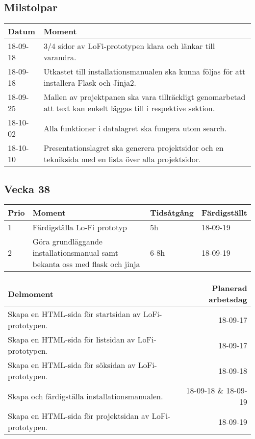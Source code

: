 \documentclass{TDP003mall}
\begin{document}
\subsection{Milstolpar}
\begin{table}[!h]
\begin{tabularx}{\linewidth}{|l|X|}\hline
    \textbf{Datum} & \textbf{Moment} \\\hline
    18-09-18 & 3/4 sidor av LoFi-prototypen klara och länkar till varandra. \\\hline
    18-09-18 & Utkastet till installationsmanualen ska kunna följas för att installera Flask och Jinja2. \\\hline
    18-09-25 & Mallen av projektpanen ska vara tillräckligt genomarbetad att text kan enkelt läggas till i respektive sektion. \\\hline
    18-10-02 & Alla funktioner i datalagret ska fungera utom search. \\\hline
    18-10-10 & Presentationslagret ska generera projektsidor och en tekniksida med en lista över alla projektsidor. \\\hline
\end{tabularx}
\end{table}


\subsection{Vecka 38}
\begin{table}[!h]
\begin{tabularx}{\linewidth}{|l|X|l|l|}
\hline
\textbf{Prio} & \textbf{Moment} & \textbf{Tidsåtgång} & \textbf{Färdigställt}\\\hline
1 & Färdigställa Lo-Fi prototyp & 5h & 18-09-19  \\\hline
2 & Göra grundläggande installationsmanual samt bekanta
oss med flask och jinja & 6-8h & 18-09-19 \\\hline
\end{tabularx}
\end{table}

\begin{table}[!h]
\begin{tabularx}{\linewidth}{|X|r|}\hline
    \textbf{Delmoment} & \textbf{ Planerad arbetsdag} \\\hline
    Skapa en HTML-sida för startsidan av LoFi-prototypen. & 18-09-17 \\\hline
    Skapa en HTML-sida för listsidan av LoFi-prototypen. & 18-09-17 \\\hline
    Skapa en HTML-sida för söksidan av LoFi-prototypen. & 18-09-18 \\\hline
    Skapa och färdigställa installationsmanualen. & 18-09-18 \& 18-09-19 \\\hline
    Skapa en HTML-sida för projektsidan av LoFi-prototypen. & 18-09-19 \\\hline
\end{tabularx}
\end{table}
\end{document}
